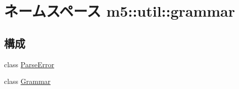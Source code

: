 \hypertarget{namespacem5_1_1util_1_1grammar}{
\section{ネームスペース m5::util::grammar}
\label{namespacem5_1_1util_1_1grammar}
}
\subsection*{構成}
\begin{DoxyCompactItemize}
\item 
class \hyperlink{classm5_1_1util_1_1grammar_1_1ParseError}{ParseError}
\item 
class \hyperlink{classm5_1_1util_1_1grammar_1_1Grammar}{Grammar}
\end{DoxyCompactItemize}
